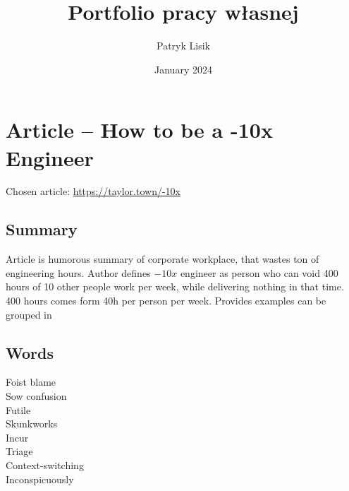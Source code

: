 \documentclass[13pt,twoside,a4paper]{article}
\begin{document}
\title{Portfolio pracy własnej}
\author{Patryk Lisik}
\date{January 2024}
\maketitle

\section*{Article -- How to be a -10x Engineer} 
Chosen article: \url{https://taylor.town/-10x}

\subsection*{Summary}

Article is humorous summary of corporate workplace, that wastes ton of engineering hours.
Author defines $-10x$ engineer as person who can void 400 hours of 10 other people work per week, while
delivering nothing in that time. 
400 hours comes form 40h per person per week. 
Provides examples can be grouped in 

\subsection*{Words}

\begin{description}
    \item[Foist blame] 
    \item[Sow confusion]
    \item[Futile]
    \item[Skunkworks]
    \item[Incur ]
    \item[Triage]
    \item[Context-switching]
    \item[Inconspicuously ]

\end{description}
\end{document}
